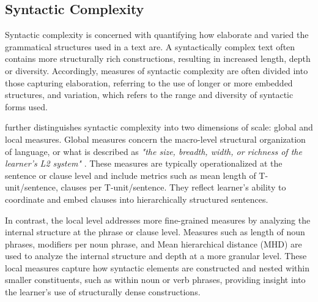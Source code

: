
\subsection{Syntactic Complexity}


Syntactic complexity is concerned with quantifying how elaborate and varied the grammatical structures used in a
    text are. A syntactically complex text often contains more structurally rich constructions, resulting in
increased length, depth or diversity. Accordingly, measures of syntactic complexity are often divided into those capturing elaboration, referring to the use of
    longer or more embedded structures, and variation, which refers to the range and diversity of syntactic forms
    used.

\citet{Butle2012} further distinguishes syntactic complexity into two dimensions of scale: global and local
measures. Global
measures concern the macro-level structural organization of language, or what is described as
\textit{"the size, breadth, width, or richness of the
learner's L2 system"} \citep{Butle2012}. These measures are typically operationalized at the sentence or clause level
and include metrics such as mean length of T-unit/sentence, clauses per T-unit/sentence. They reflect
learner's ability to coordinate and embed clauses into hierarchically structured sentences.

In contrast, the local level addresses more fine-grained measures by analyzing
the internal structure at the phrase or clause level. Measures such as length of noun phrases,
modifiers per noun phrase, and Mean hierarchical distance (MHD) are used to analyze the internal structure and depth
at a more granular level. These local measures capture how syntactic elements are constructed and nested within
smaller constituents, such as within noun or verb phrases, providing insight into the learner's use of structurally
dense constructions.

